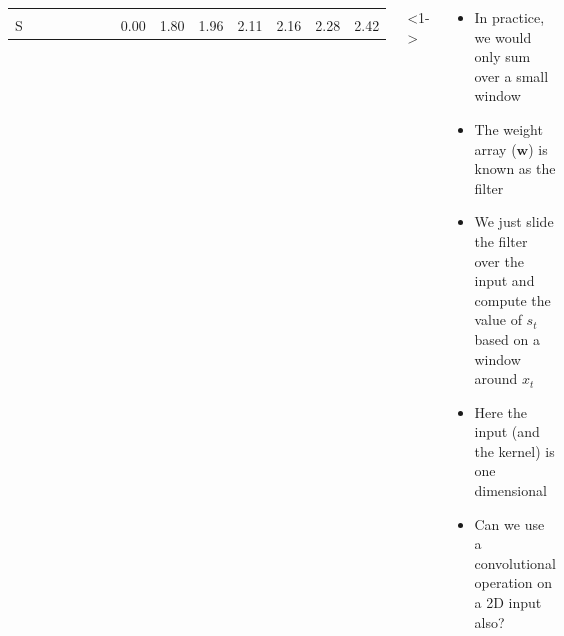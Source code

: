 \begin{frame}
\begin{columns}
\begin{overlayarea}{\textwidth}{\textheight}
\begin{minipage}[t]{0.25\textwidth}
{\begin{table}[h]
{\begin{tabular}{p{0.1cm}p{0.1cm}p{0.1cm}p{0.1cm}p{0.1cm}p{0.1cm}p{0.1cm}p{0.1cm}p{0.1cm}p{0.1cm}p{0.1cm}p{0.1cm}p{0.1cm}p{0.1cm}}
								\multicolumn{1}{l}{} &                       & \multicolumn{1}{l}{}      & \multicolumn{1}{l}{}      & \multicolumn{1}{l}{}      & \multicolumn{1}{l}{}      & \multicolumn{1}{l}{}      & \multicolumn{1}{l}{}                             & \multicolumn{1}{l}{}                             & \multicolumn{1}{l}{}                             & \multicolumn{1}{l}{}                             & \multicolumn{1}{l}{}                             & \multicolumn{1}{l}{}                             &                                                   \\ \cline{9-14} 
								
								S                    &                       &                           &                           &                           &                           &                           & \multicolumn{1}{c|}{{\color[HTML]{FFFFFF} 0.00}} & \multicolumn{1}{c|}{{\color[HTML]{333333} 1.80}} & \multicolumn{1}{c|}{{\color[HTML]{333333} 1.96}} & \multicolumn{1}{c|}{{\color[HTML]{333333} 2.11}} & \multicolumn{1}{c|}{{\color[HTML]{333333} 2.16}} & \multicolumn{1}{c|}{{\color[HTML]{333333} 2.28}} & \multicolumn{1}{c|}{{\color[HTML]{333333} 2.42 }} \\ \cline{9-14}  
							\end{tabular}
						}
					\end{table}
				}
			\end{minipage}
		\end{overlayarea}
		       
		<1->
		\begin{overlayarea}{\textwidth}{\textheight}
			\small{
				\begin{itemize}
					\justifying
					\item<1-> In practice, we would only sum over a small window
					\item<2-> The weight array ($\mathbf{w}$) is known as the filter
					\item<3-> We just slide the filter over the input and compute the value of $s_t$ based on a window around $x_t$
					\item<9-> Here the input (and the kernel) is one dimensional
					\item<10-> Can we use a convolutional operation on a 2D input also?
				\end{itemize}
			}
		\end{overlayarea}
	\end{columns}
\end{frame}


